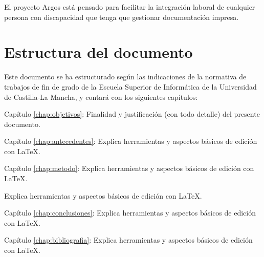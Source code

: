 El proyecto Argos está pensado para facilitar la integración laboral de cualquier persona con discapacidad que tenga que gestionar documentación impresa. 


\section{Estructura del documento}

Este documento se ha estructurado según las indicaciones de la normativa de trabajos de fin de grado de la Escuela Superior de Informática de la Universidad de Castilla-La Mancha, y contará con  los siguientes capítulos:
\begin{definitionlist}
\item[Capítulo \ref{chap:objetivos}: \nameref{chap:objetivos}] Finalidad y justificación  (con todo detalle) del presente documento.
\item[Capítulo \ref{chap:antecedentes}: \nameref{chap:antecedentes}] Explica herramientas y aspectos básicos de edición con \LaTeX.
\item[Capítulo \ref{chap:metodo}: \nameref{chap:metodo}] Explica herramientas y aspectos básicos de edición con \LaTeX.
\item[Capítulo \ref{chap:resultados}: \nameref{chap:resultados] Explica herramientas y aspectos básicos de edición con \LaTeX.
\item[Capítulo \ref{chap:conclusiones}: \nameref{chap:conclusiones}] Explica herramientas y aspectos básicos de edición con \LaTeX.
\item[Capítulo \ref{chap:bibliografia}: \nameref{chap:bibliografia}] Explica herramientas y aspectos básicos de edición con \LaTeX.
\end{definitionlist}



